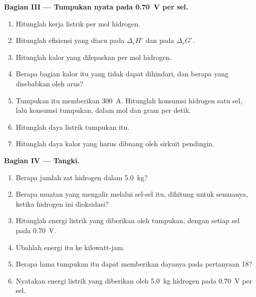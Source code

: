 \begin{problem}
\medskip
\noindent\textbf{Bagian III --- Tumpukan nyata pada \qty{0.70}{V} per sel.}
\begin{enumerate}[resume]
  \item Hitunglah kerja listrik per mol hidrogen.
  \item Hitunglah efisiensi yang diacu pada $\Delta_r H^\circ$ dan pada
        $\Delta_r G^\circ$.
  \item Hitunglah kalor yang dilepaskan per mol hidrogen.
  \item Berapa bagian kalor itu yang tidak dapat dihindari, dan berapa yang
        disebabkan oleh arus?
  \item Tumpukan itu memberikan \qty{300}{A}. Hitunglah konsumsi hidrogen
        satu sel, lalu konsumsi tumpukan, dalam mol dan gram per detik.
  \item Hitunglah daya listrik tumpukan itu.
  \item Hitunglah daya kalor yang harus dibuang oleh sirkuit pendingin.
\end{enumerate}

\medskip
\noindent\textbf{Bagian IV --- Tangki.}
\begin{enumerate}[resume]
  \item Berapa jumlah zat hidrogen dalam \qty{5.0}{kg}?
  \item Berapa muatan yang mengalir melalui sel-sel itu, dihitung untuk
        semuanya, ketika hidrogen ini dioksidasi?
  \item Hitunglah energi listrik yang diberikan oleh tumpukan, dengan
        setiap sel pada \qty{0.70}{V}.
  \item Ubahlah energi itu ke kilowatt-jam.
  \item Berapa lama tumpukan itu dapat memberikan dayanya pada pertanyaan
        18?
  \item Nyatakan energi listrik yang diberikan oleh \qty{5.0}{kg} hidrogen
        pada \qty{0.70}{V} per sel.
\end{enumerate}
\end{problem}
